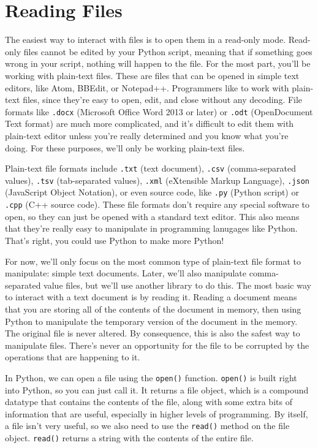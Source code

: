 \section{Reading Files}
The easiest way to interact with files is to open them in a read-only mode. Read-only files cannot be edited by your Python script, meaning that if something goes wrong in your script, nothing will happen to the file. For the most part, you'll be working with plain-text files. These are files that can be opened in simple text editors, like Atom, BBEdit, or Notepad++. Programmers like to work with plain-text files, since they're easy to open, edit, and close without any decoding. File formats like \verb|.docx| (Microsoft Office Word 2013 or later) or \verb|.odt| (OpenDocument Text format) are much more complicated, and it's difficult to edit them with plain-text editor unless you're really determined and you know what you're doing. For these purposes, we'll only be working plain-text files.\par
Plain-text file formats include \verb|.txt| (text document), \verb|.csv| (comma-separated values), \verb|.tsv| (tab-separated values), \verb|.xml| (eXtensible Markup Language), \verb|.json| (JavaScript Object Notation), or even source code, like \verb|.py| (Python script) or \verb|.cpp| (C++ source code). These file formats don't require any special software to open, so they can just be opened with a standard text editor. This also means that they're really easy to manipulate in programming lanugages like Python. That's right, you could use Python to make more Python!\par
For now, we'll only focus on the most common type of plain-text file format to manipulate: simple text documents. Later, we'll also manipulate comma-separated value files, but we'll use another library to do this. The most basic way to interact with a text document is by reading it. Reading a document means that you are storing all of the contents of the document in memory, then using Python to manipulate the temporary version of the document in the memory. The original file is never altered. By consequence, this is also the safest way to manipulate files. There's never an opportunity for the file to be corrupted by the operations that are happening to it.\par
In Python, we can open a file using the \verb|open()| function. \verb|open()| is built right into Python, so you can just call it. It returns a file object, which is a compound datatype that contains the contents of the file, along with some extra bits of information that are useful, especially in higher levels of programming. By itself, a file isn't very useful, so we also need to use the \verb|read()| method on the file object. \verb|read()| returns a string with the contents of the entire file.\par
